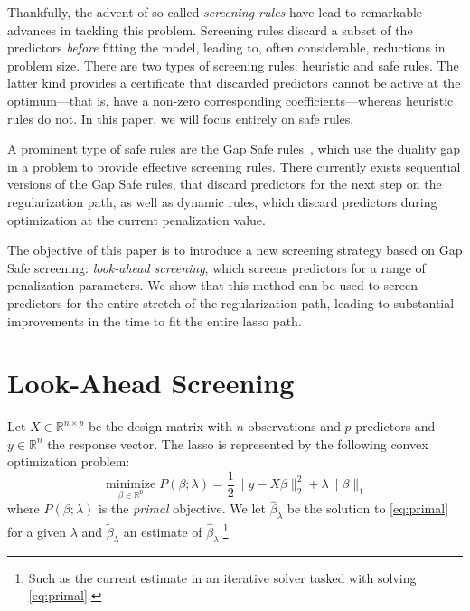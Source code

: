 \documentclass[b5paper,10pt,abstractoff,DIV=calc,headings=normal,twoside]{scrartcl}
\theoremstyle{plain}
\theoremstyle{definition}
\theoremstyle{remark}
\begin{document}
Thankfully, the advent of so-called \emph{screening rules} have lead to
remarkable advances in tackling this problem. Screening rules discard a
subset of the predictors \emph{before} fitting the model, leading to, often
considerable, reductions in problem size. There are two types of screening
rules: heuristic and safe rules.
The latter kind provides a certificate that discarded predictors cannot be
active at the optimum---that is, have a non-zero corresponding
coefficients---whereas heuristic rules do not. In this paper, we will
focus entirely on safe rules.

A prominent type of safe rules are the Gap Safe
rules~\citep{ndiaye2017,fercoq2015}, which use the duality gap in a problem
to provide effective screening rules. There currently exists
sequential versions of
the Gap Safe rules, that discard predictors for the next step on the
regularization path, as well as dynamic rules, which discard predictors
during optimization at the current penalization value.

The objective of this paper is to introduce a new screening strategy based
on Gap Safe screening: \emph{look-ahead screening}, which
screens predictors for a range of penalization parameters. We
show that this method can be used to screen predictors for the entire
stretch of the regularization path, leading to substantial improvements in
the time to fit the entire lasso path.

\section{Look-Ahead Screening}%
\label{sec:look-ahead-screening}

Let \(X \in \mathbb{R}^{n \times p}\) be the design matrix with \(n\)
observations and \(p\) predictors
and \(y \in \mathbb{R}^n\) the response vector.
The lasso is represented by the following convex optimization problem:
\begin{equation}
  \label{eq:primal}
  \operatorname*{minimize}_{\beta \in \mathbb{R}^p} P(\beta; \lambda)
  = \frac 1 2 \lVert y - X\beta \rVert_2^2 + \lambda \lVert \beta \rVert_1
\end{equation}
where \(P(\beta;\lambda)\)
is the \emph{primal} objective. We let \(\hat \beta_\lambda\) be the solution to
\eqref{eq:primal} for a given \(\lambda\) and \(\tilde
\beta_\lambda\) an estimate of \(\hat\beta_\lambda\).\footnote{Such as
  the current estimate in an iterative solver tasked with solving
  \eqref{eq:primal}.}
\end{document}
